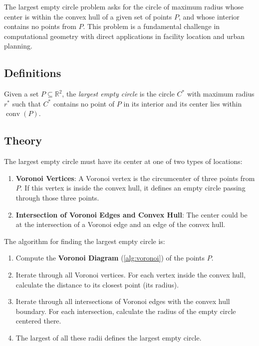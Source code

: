 The largest empty circle problem asks for the circle of maximum radius whose center is within the convex hull of a given set of points $P$, and whose interior contains no points from $P$. This problem is a fundamental challenge in computational geometry with direct applications in facility location and urban planning.

\subsection{Definitions}

\begin{definition}\label{def:largest_empty_circle}
Given a set $P \subseteq \mathbb{R}^2$, the \emph{largest empty circle} is the circle $C^*$ with maximum radius $r^*$ such that $C^*$ contains no point of $P$ in its interior and its center lies within $\operatorname{conv}(P)$.
\end{definition}

\subsection{Theory}

The largest empty circle must have its center at one of two types of locations:
\begin{enumerate}
\item \textbf{Voronoi Vertices}: A Voronoi vertex is the circumcenter of three points from $P$. If this vertex is inside the convex hull, it defines an empty circle passing through those three points.
\item \textbf{Intersection of Voronoi Edges and Convex Hull}: The center could be at the intersection of a Voronoi edge and an edge of the convex hull.
\end{enumerate}

The algorithm for finding the largest empty circle is:
\begin{enumerate}
\item Compute the \textbf{Voronoi Diagram} (\cref{alg:voronoi}) of the points $P$.
\item Iterate through all Voronoi vertices. For each vertex inside the convex hull, calculate the distance to its closest point (its radius).
\item Iterate through all intersections of Voronoi edges with the convex hull boundary. For each intersection, calculate the radius of the empty circle centered there.
\item The largest of all these radii defines the largest empty circle.
\end{enumerate}

